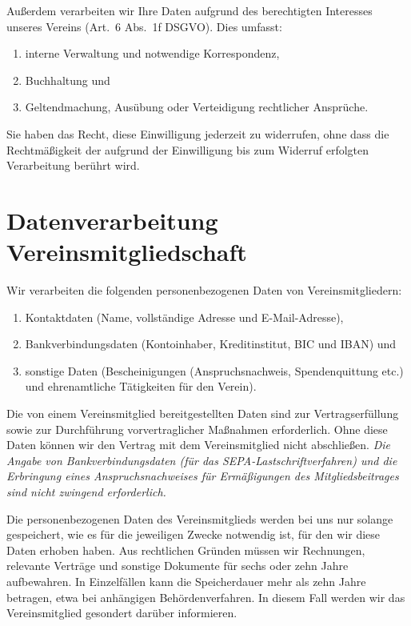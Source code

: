 \documentclass[a4paper, 10pt, headings=normal]{scrartcl}
\begin{document}
\begin{multicols*}{2}
Außerdem verarbeiten wir Ihre Daten aufgrund des berechtigten Interesses unseres Vereins (Art.~6 Abs.~1f DSGVO). Dies umfasst:

\begin{enumerate}[label={\arabic*.}]
	\item
		interne Verwaltung und notwendige Korrespondenz,
	\item
		Buchhaltung und
	\item
		Geltendmachung, Ausübung oder Verteidigung rechtlicher Ansprüche.
\end{enumerate}

Sie haben das Recht, diese Einwilligung jederzeit zu widerrufen, ohne dass die Rechtmäßigkeit der aufgrund der Einwilligung bis zum Widerruf erfolgten Verarbeitung berührt wird.

\section{Datenverarbeitung Vereinsmitgliedschaft}

Wir verarbeiten die folgenden personenbezogenen Daten von Vereinsmitgliedern:

\begin{enumerate}[label={\arabic*.}]
	\item
		Kontaktdaten (Name, vollständige Adresse und E-Mail-Adresse),
	\item
		Bankverbindungsdaten (Kontoinhaber, Kreditinstitut, BIC und IBAN) und
	\item
		sonstige Daten (Bescheinigungen (Anspruchsnachweis, Spendenquittung etc.) und ehrenamtliche Tätigkeiten für den Verein).
\end{enumerate}

Die von einem Vereinsmitglied bereitgestellten Daten sind zur Vertragserfüllung sowie zur Durchführung vorvertraglicher Maßnahmen erforderlich.
Ohne diese Daten können wir den Vertrag mit dem Vereinsmitglied nicht abschließen.
\emph{Die Angabe von Bankverbindungsdaten (für das SEPA-Lastschriftverfahren) und die Erbringung eines Anspruchsnachweises für Ermäßigungen des Mitgliedsbeitrages sind nicht zwingend erforderlich.}

Die personenbezogenen Daten des Vereinsmitglieds werden bei uns nur solange gespeichert, wie es für die jeweiligen Zwecke notwendig ist, für den wir diese Daten erhoben haben.
Aus rechtlichen Gründen müssen wir Rechnungen, relevante Verträge und sonstige Dokumente für sechs oder zehn Jahre aufbewahren.
In Einzelfällen kann die Speicherdauer mehr als zehn Jahre betragen, etwa bei anhängigen Behördenverfahren.
In diesem Fall werden wir das Vereinsmitglied gesondert darüber informieren.


\end{multicols*}
\end{document}
